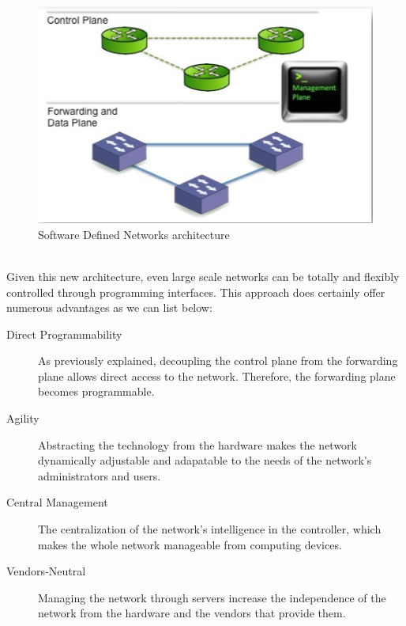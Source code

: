 \begin{figure}[htp]
    \includegraphics[scale=0.8]{sdn}
    \hspace*{-2cm}
    \caption{Software Defined Networks architecture }
\end{figure}
\\
Given this new architecture, even
large scale networks can be totally and flexibly controlled through programming interfaces. This approach does certainly offer numerous advantages as we can list below:
\begin{description}
\item[Direct Programmability] As previously explained, decoupling the control plane from the forwarding plane allows direct access to the network. Therefore, the forwarding plane becomes programmable.
\item[Agility] Abstracting the technology from the hardware makes the network dynamically adjustable and adapatable to the needs of the network’s administrators and users.
\item[Central Management] The centralization of the network’s intelligence in the controller, which makes the whole network manageable from computing devices.
\item[Vendors-Neutral] Managing the network through servers increase the independence of the network from the hardware and the vendors that provide them.
\end{description}
